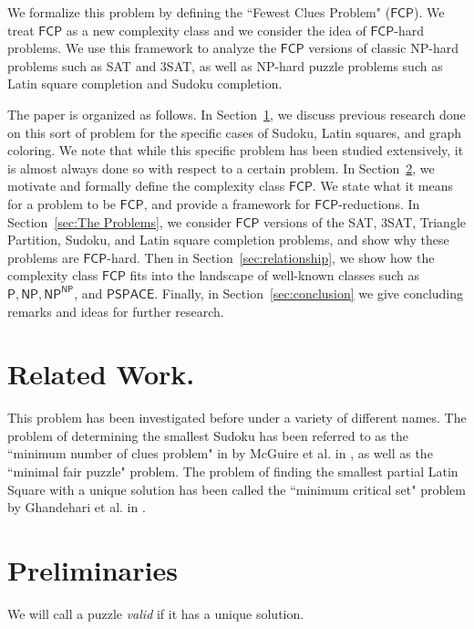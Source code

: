 \documentclass[runningheads,a4paper]{llncs}
\begin{document}
We formalize this problem by defining the ``Fewest Clues Problem" ($\mathsf{FCP}$). We treat $\mathsf{FCP}$ as a new complexity class and we consider the idea of $\mathsf{FCP}$-hard problems. We use this framework to analyze the $\mathsf{FCP}$ versions of classic NP-hard problems such as SAT and 3SAT, as well as NP-hard puzzle problems such as Latin square completion and Sudoku completion. 

The paper is organized as follows. In Section~\ref{sec:related}, we discuss previous research done on this sort of problem for the specific cases of Sudoku, Latin squares, and graph coloring. We note that while this specific problem has been studied extensively, it is almost always done so with respect to a certain problem. In Section~\ref{sec:prelim}, we motivate and formally define the complexity class $\mathsf{FCP}$. We state what it means for a problem to be $\mathsf{FCP}$, and provide a framework for $\mathsf{FCP}$-reductions. In Section~\ref{sec:The Problems}, we consider $\mathsf{FCP}$ versions of the SAT, 3SAT, Triangle Partition, Sudoku, and Latin square completion problems, and show why these problems are $\mathsf{FCP}$-hard. Then in Section~\ref{sec:relationship}, we show how the complexity class $\mathsf{FCP}$ fits into the landscape of well-known classes such as $\mathsf{P}, \mathsf{NP}, \mathsf{NP}^\mathsf{NP}$, and $\mathsf{PSPACE}$. Finally, in Section~\ref{sec:conclusion} we give concluding remarks and ideas for further research.


\section{Related Work.}
\label{sec:related}

This problem has been investigated before under a variety of different names. The problem of determining the smallest Sudoku has been referred to as the ``minimum number of clues problem" in
by McGuire et al. in \cite{mcguire2012there}, as well as the ``minimal fair puzzle" problem. The problem of finding the smallest partial Latin Square with a unique solution has been called the ``minimum critical set" problem by Ghandehari et al. in \cite{Ghandehari2005121} .

\section{Preliminaries}
\label{sec:prelim}

\begin{definition}
We will call a puzzle \emph{valid} if it has a unique solution.
\end{definition}
\end{document}
